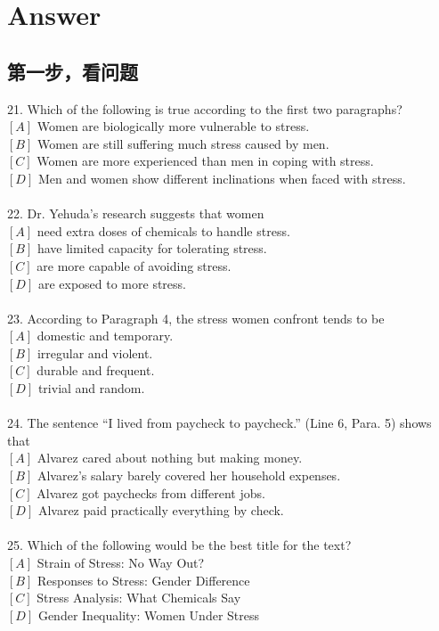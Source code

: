 \documentclass[a4paper]{ctexart}
\begin{document}
\section{Answer}
\subsection{第一步，看问题}

21.	Which of the following is true according to the first two paragraphs?\\
$[A]$ Women are biologically more vulnerable to stress.\\
$[B]$ Women are still suffering much stress caused by men.\\
$[C]$ Women are more experienced than men in coping with stress.\\
$[D]$ Men and women show different inclinations when faced with stress.\\
\\
22.	Dr. Yehuda’s research suggests that women\\
$[A]$ need extra doses of chemicals to handle stress.\\
$[B]$ have limited capacity for tolerating stress.\\
$[C]$ are more capable of avoiding stress.\\
$[D]$ are exposed to more stress.\\
\\
23.	According to Paragraph 4, the stress women confront tends to be\\
$[A]$ domestic and temporary.\\
$[B]$ irregular and violent.\\
$[C]$ durable and frequent.\\
$[D]$ trivial and random.\\
\\
24.	The sentence “I lived from paycheck to paycheck.” (Line 6, Para. 5) shows that\\
$[A]$ Alvarez cared about nothing but making money.\\
$[B]$ Alvarez’s salary barely covered her household expenses.\\
$[C]$ Alvarez got paychecks from different jobs.\\
$[D]$ Alvarez paid practically everything by check.\\
\\
25.	Which of the following would be the best title for the text?\\
$[A]$ Strain of Stress: No Way Out?\\
$[B]$ Responses to Stress: Gender Difference\\
$[C]$ Stress Analysis: What Chemicals Say\\
$[D]$ Gender Inequality: Women Under Stress\\
\end{document}
